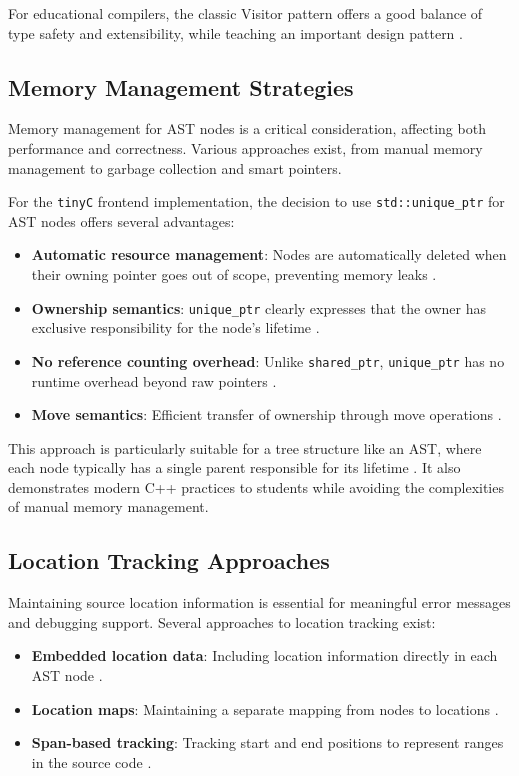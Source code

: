 For educational compilers, the classic Visitor pattern offers a good balance of type safety and extensibility, while teaching an important design pattern \cite{gamma1995design}.

\subsection{Memory Management Strategies}

Memory management for AST nodes is a critical consideration, affecting both performance and correctness. Various approaches exist, from manual memory management to garbage collection and smart pointers.

For the \texttt{tinyC} frontend implementation, the decision to use \texttt{std::unique\_ptr} for AST nodes offers several advantages:
\begin{itemize}
    \item \textbf{Automatic resource management}: Nodes are automatically deleted when their owning pointer goes out of scope, preventing memory leaks \cite{meyers2014effective}.
    \item \textbf{Ownership semantics}: \texttt{unique\_ptr} clearly expresses that the owner has exclusive responsibility for the node's lifetime \cite{stroustrup2013cxx}.
    \item \textbf{No reference counting overhead}: Unlike \texttt{shared\_ptr}, \texttt{unique\_ptr} has no runtime overhead beyond raw pointers \cite{meyers2014effective}.
    \item \textbf{Move semantics}: Efficient transfer of ownership through move operations \cite{stroustrup2013cxx}.
\end{itemize}

This approach is particularly suitable for a tree structure like an AST, where each node typically has a single parent responsible for its lifetime \cite{meyers2014effective}. It also demonstrates modern C++ practices to students while avoiding the complexities of manual memory management.

\subsection{Location Tracking Approaches}

Maintaining source location information is essential for meaningful error messages and debugging support. Several approaches to location tracking exist:

\begin{itemize}
    \item \textbf{Embedded location data}: Including location information directly in each AST node \cite{appel2004modern}.
    \item \textbf{Location maps}: Maintaining a separate mapping from nodes to locations \cite{lesk1975lex}.
    \item \textbf{Span-based tracking}: Tracking start and end positions to represent ranges in the source code \cite{parr2013definitive}.
\end{itemize}

